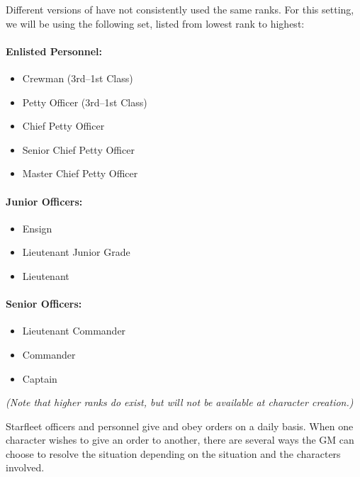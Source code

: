 \documentclass[12pt,titlepage,openany]{book}
\begin{document}
Different versions of \StarTrek{} have not consistently used the same ranks.
For this setting, we will be using the following set, listed from lowest rank
to highest:

\begin{multicols}{2}
    \raggedcolumns
    \paragraph{Enlisted Personnel:}
    \begin{itemize}
        \item Crewman (3rd--1st Class)
        \item Petty Officer (3rd--1st Class)
        \item Chief Petty Officer
        \item Senior Chief Petty Officer
        \item Master Chief Petty Officer
    \end{itemize}

    \columnbreak
    \paragraph{Junior Officers:}
    \begin{itemize}
        \item Ensign
        \item Lieutenant Junior Grade
        \item Lieutenant
    \end{itemize}

    \paragraph{Senior Officers:}
    \begin{itemize}
        \item Lieutenant Commander
        \item Commander
        \item Captain
    \end{itemize}
\end{multicols}

\noindent \emph{(Note that higher ranks do exist, but will not be available at
character creation.)}

\vspace{1em}

Starfleet officers and personnel give and obey orders on a daily basis. When
one character wishes to give an order to another, there are several ways the GM
can choose to resolve the situation depending on the situation and the
characters involved.
\end{document}
